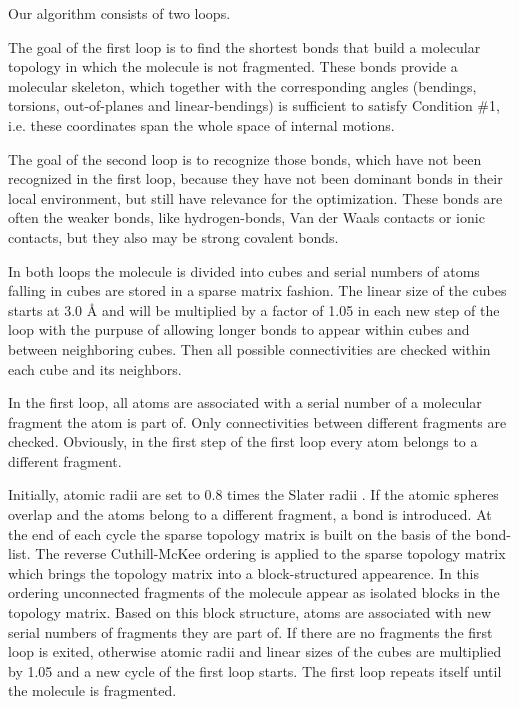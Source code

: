 \documentclass[prl,aps,preprint,superbib,12pt]{revtex4}
\begin{document}
Our algorithm consists of two loops.

The goal of the first loop is to find the shortest bonds
that build a molecular topology in which the molecule is not 
fragmented. These bonds provide a molecular skeleton, which together
with the corresponding angles (bendings, torsions, out-of-planes and 
linear-bendings) is sufficient to satisfy Condition \#1, i.e.
these coordinates span the whole space of internal motions. 

The goal of the second loop is to recognize those bonds, which 
have not been recognized in the first loop, because they have not been
dominant bonds in their local environment, but still have relevance
for the optimization. These bonds are often the weaker bonds,
like hydrogen-bonds, Van der Waals contacts or ionic
contacts, but they also may be strong covalent bonds.

In both loops the molecule is divided into cubes and
serial numbers of atoms falling in cubes are stored in a sparse matrix
fashion. The linear size of the cubes starts at 3.0 \AA
and will be multiplied by a factor of 1.05 in each new step of the loop
with the purpuse of allowing longer bonds to appear within cubes and 
between neighboring cubes.
Then all possible connectivities are checked within each cube 
and its neighbors. 

In the first loop, all atoms are associated with a serial number of a 
molecular fragment the atom is part of. Only connectivities
between different fragments are checked. Obviously, in the first
step of the first loop every atom belongs to a different fragment.

Initially, atomic radii are set to 0.8 times the Slater radii
\cite{Slater_64v41}. If the atomic spheres overlap and the atoms 
belong to a different fragment, a bond is
introduced. At the end of each cycle the sparse topology
matrix is built on the basis of the bond-list. The 
reverse Cuthill-McKee ordering \cite{AGeorge81} is applied
to the sparse topology matrix which brings the topology matrix
into a block-structured appearence. In this ordering unconnected 
fragments of the molecule appear as isolated blocks in the 
topology matrix. Based on this block structure, atoms are associated
with new serial numbers of fragments they are part of.
If there are no fragments the first loop is exited, otherwise
atomic radii and linear sizes of the cubes are multiplied by 1.05
and a new cycle of the first loop starts. The first loop repeats
itself until the molecule is fragmented. 
\end{document}
